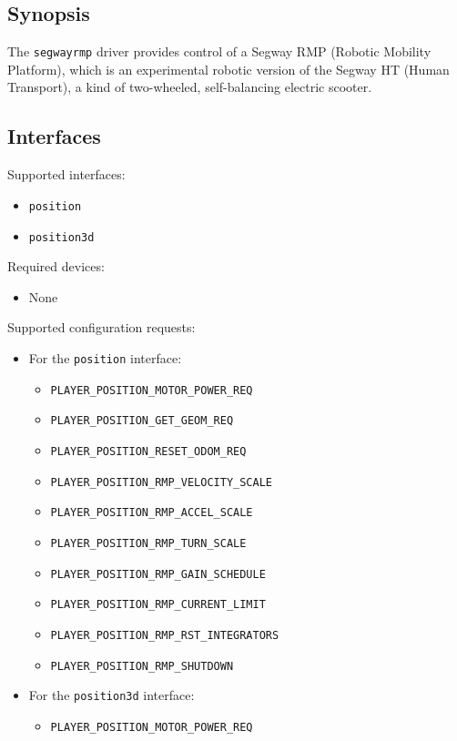 \subsection*{Synopsis}
The {\tt segwayrmp} driver provides control of a Segway RMP (Robotic
Mobility Platform), which is an experimental robotic version of the Segway
HT (Human Transport), a kind of two-wheeled, self-balancing electric
scooter.

\subsection*{Interfaces}

\noindent Supported interfaces:

\begin{itemize}
\item {\tt position}
\item {\tt position3d}
\end{itemize}

\noindent Required devices:
\begin{itemize}
\item None
\end{itemize}

\noindent Supported configuration requests:
\begin{itemize}
\item For the {\tt position} interface:
\begin{itemize}
\item {\tt PLAYER\_POSITION\_MOTOR\_POWER\_REQ}
\item {\tt PLAYER\_POSITION\_GET\_GEOM\_REQ}
\item {\tt PLAYER\_POSITION\_RESET\_ODOM\_REQ}
\item {\tt PLAYER\_POSITION\_RMP\_VELOCITY\_SCALE}
\item {\tt PLAYER\_POSITION\_RMP\_ACCEL\_SCALE}
\item {\tt PLAYER\_POSITION\_RMP\_TURN\_SCALE}
\item {\tt PLAYER\_POSITION\_RMP\_GAIN\_SCHEDULE}
\item {\tt PLAYER\_POSITION\_RMP\_CURRENT\_LIMIT}
\item {\tt PLAYER\_POSITION\_RMP\_RST\_INTEGRATORS}
\item {\tt PLAYER\_POSITION\_RMP\_SHUTDOWN}
\end{itemize}
\item For the {\tt position3d} interface:
\begin{itemize}
\item {\tt PLAYER\_POSITION\_MOTOR\_POWER\_REQ}
\end{itemize}
\end{itemize}

